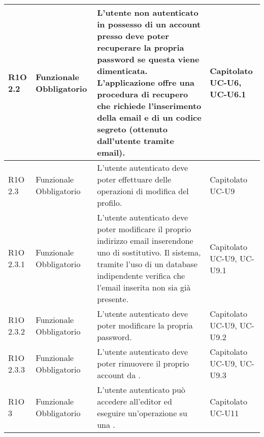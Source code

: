 \begin{center}
\begin{longtable}{ | l | p{2cm} | p{4.7cm} | p{2cm} |}
	R1O 2.2 & Funzionale \newline Obbligatorio & L’utente non autenticato in possesso di un account presso \glossaryItem{MaaS} deve poter recuperare la propria password se questa viene dimenticata.
L'applicazione offre una procedura di recupero che richiede l’inserimento della email e di un codice segreto (ottenuto dall’utente tramite email). &  Capitolato \newline UC-U6, UC-U6.1   \newline  \\ \hline
	
	R1O 2.3 & Funzionale \newline Obbligatorio & L’utente autenticato deve poter effettuare delle operazioni di modifica del profilo. &  Capitolato \newline  UC-U9  \newline  \\ \hline
	
	R1O 2.3.1 & Funzionale \newline Obbligatorio & L’utente autenticato deve poter modificare il proprio indirizzo email inserendone uno di sostitutivo. Il sistema, tramite l’uso di un database indipendente verifica che l’email inserita non sia già presente. &  Capitolato \newline  UC-U9, UC-U9.1  \newline  \\ \hline
	
	R1O 2.3.2 & Funzionale \newline Obbligatorio & L’utente autenticato deve poter modificare la propria password. &  Capitolato \newline  UC-U9, UC-U9.2  \newline  \\ \hline
	
	R1O 2.3.3 & Funzionale \newline Obbligatorio & L’utente autenticato deve poter rimuovere il proprio account da \glossaryItem{MaaS}. &  Capitolato \newline  UC-U9, UC-U9.3  \newline  \\ \hline
	
	R1O 3 & Funzionale \newline Obbligatorio & L’utente autenticato può accedere all’editor ed eseguire un’operazione su una \glossaryItem{DSL}. &  Capitolato \newline  UC-U11  \newline  \\ \hline
	

\end{longtable}
\end{center}
